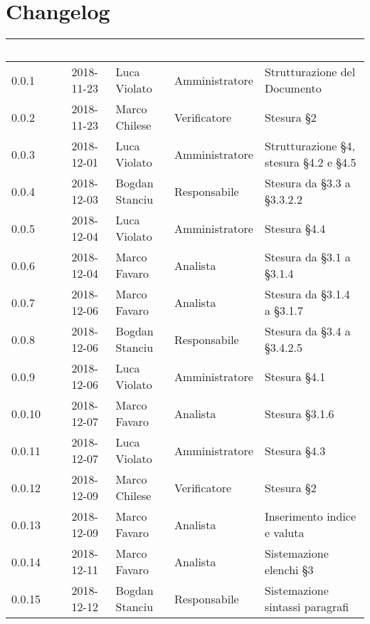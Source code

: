 \section{Changelog}

\begin{center}
\begin{longtable}[c]{|m{}|m{}|m{}|m{}|p{}|}
\hline
\rowcolor{bluelogo}\textbf{\textcolor{white}{Versione}} & \textbf{\textcolor{white}{Data}} & \textbf{\textcolor{white}{Autore}} & \textbf{\textcolor{white}{Ruolo}} & \textbf{\textcolor{white}{Descrizione}} \\
\hline \hline
\endfirsthead
0.0.1 & 2018-11-23 & Luca Violato & Amministratore & Strutturazione del Documento \\
\hline
\rowcolor{grigio}0.0.2 & 2018-11-23 & Marco Chilese & Verificatore & Stesura §2\\
\hline
0.0.3 & 2018-12-01 & Luca Violato & Amministratore & Strutturazione §4, stesura §4.2 e §4.5 \\
\hline
\rowcolor{grigio}0.0.4 & 2018-12-03 & Bogdan Stanciu & Responsabile & Stesura da §3.3 a §3.3.2.2 \\
\hline
0.0.5 & 2018-12-04 & Luca Violato & Amministratore & Stesura §4.4 \\
\hline
\rowcolor{grigio}0.0.6 & 2018-12-04 & Marco Favaro & Analista & Stesura da §3.1 a §3.1.4 \\
\hline
0.0.7 & 2018-12-06 & Marco Favaro & Analista & Stesura da §3.1.4 a §3.1.7 \\
\hline
\rowcolor{grigio}0.0.8 & 2018-12-06 & Bogdan Stanciu & Responsabile & Stesura da §3.4 a §3.4.2.5 \\
\hline
0.0.9 & 2018-12-06 & Luca Violato & Amministratore & Stesura §4.1\\
\hline
\rowcolor{grigio}0.0.10 & 2018-12-07 & Marco Favaro & Analista & Stesura §3.1.6\\
\hline
0.0.11 & 2018-12-07 & Luca Violato & Amministratore & Stesura §4.3\\
\hline
\rowcolor{grigio}0.0.12 & 2018-12-09 & Marco Chilese & Verificatore & Stesura §2\\
\hline
0.0.13 & 2018-12-09 & Marco Favaro & Analista & Inserimento indice e valuta\\
\hline
\rowcolor{grigio}0.0.14 & 2018-12-11 & Marco Favaro & Analista & Sistemazione elenchi §3\\
\hline
0.0.15 & 2018-12-12 & Bogdan Stanciu & Responsabile & Sistemazione sintassi paragrafi\\

\end{longtable}
\end{center}
